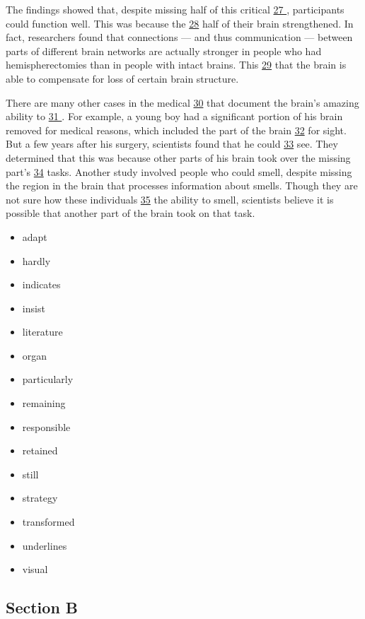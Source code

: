 \documentclass[UTF8,11pt]{ctexart}
\begin{document}
The findings showed that, despite missing half of this critical \uline{27 }, participants could function well. This was because the \uline{28} half of their brain strengthened. In fact, researchers found that connections — and thus communication — between parts of different brain networks are actually stronger in people who had hemispherectomies than in people with intact brains. This \uline{29} that the brain is able to compensate for loss of certain brain structure.


There are many other cases in the medical \uline{30} that document the brain’s amazing ability to \uline{31 }. For example, a young boy had a significant portion of his brain removed for medical reasons, which included the part of the brain \uline{32} for sight. But a few years after his surgery, scientists found that he could \uline{33} see. They determined that this was because other parts of his brain took over the missing part’s \uline{34} tasks. Another study involved people who could smell, despite missing the region in the brain that processes information about smells. Though they are not sure how these individuals \uline{35} the ability to smell, scientists believe it is possible that another part of the brain took on that task.


\begin{itemize}[leftmargin=2em,itemsep=.2em,topsep=.4em]\item[A.] adapt
\item[B.] hardly
\item[C.] indicates
\item[D.] insist
\item[E.] literature
\item[F.] organ
\item[G.] particularly
\item[H.] remaining
\item[I.] responsible
\item[J.] retained
\item[K.] still
\item[L.] strategy
\item[M.] transformed
\item[N.] underlines
\item[O.] visual
\end{itemize}

\subsection*{\textbf{Section B}}
\end{document}
